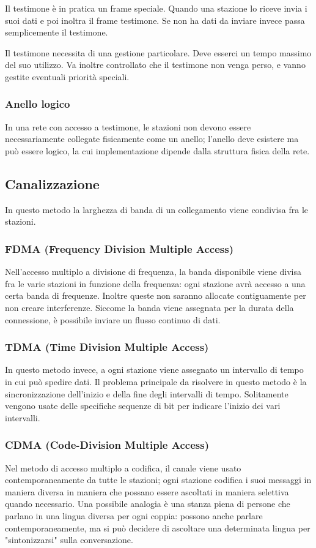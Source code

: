         Il testimone è in pratica un frame speciale. Quando una stazione lo riceve invia i suoi dati e poi inoltra il frame testimone. Se non ha dati da inviare invece passa semplicemente il testimone.
        
        Il testimone necessita di una gestione particolare. Deve esserci un tempo massimo del suo utilizzo. Va inoltre controllato che il testimone non venga perso, e vanno gestite eventuali priorità speciali.
        
        \subsubsection{Anello logico}
            In una rete con accesso a testimone, le stazioni non devono essere necessariamente collegate fisicamente come un anello; l'anello deve esistere ma può essere logico, la cui implementazione dipende dalla struttura fisica della rete.
            
    \subsection{Canalizzazione}
        In questo metodo la larghezza di banda di un collegamento viene condivisa fra le stazioni.
        
        \subsubsection{FDMA (Frequency Division Multiple Access)}
            Nell'accesso multiplo a divisione di frequenza, la banda disponibile viene divisa fra le varie stazioni in funzione della frequenza: ogni stazione avrà accesso a una certa banda di frequenze. Inoltre queste non saranno allocate contiguamente per non creare interferenze. Siccome la banda viene assegnata per la durata della connessione, è possibile inviare un flusso continuo di dati.
            
        \subsubsection{TDMA (Time Division Multiple Access)}
            In questo metodo invece, a ogni stazione viene assegnato un intervallo di tempo in cui può spedire dati. Il problema principale da risolvere in questo metodo è la sincronizzazione dell'inizio e della fine degli intervalli di tempo. Solitamente vengono usate delle specifiche sequenze di bit per indicare l'inizio dei vari intervalli.
            
        \subsubsection{CDMA (Code-Division Multiple Access)}
            Nel metodo di accesso multiplo a codifica, il canale viene usato contemporaneamente da tutte le stazioni; ogni stazione codifica i suoi messaggi in maniera diversa in maniera che possano essere ascoltati in maniera selettiva quando necessario. Una possibile analogia è una stanza piena di persone che parlano in una lingua diversa per ogni coppia: possono anche parlare contemporaneamente, ma si può decidere di ascoltare una determinata lingua per "sintonizzarsi" sulla conversazione.